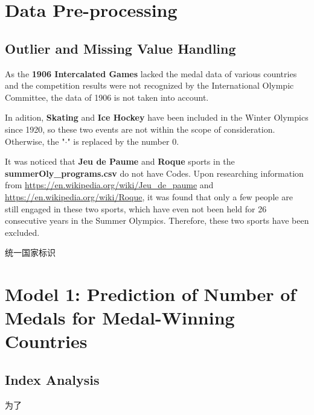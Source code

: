 \documentclass{mcmthesis}
\begin{document}
\section{Data Pre-processing}

\subsection{Outlier and Missing Value Handling}
As the \textbf{1906 Intercalated Games} lacked the medal data of various countries and the competition results were not recognized by the International Olympic Committee, the data of 1906 is not taken into account.

In adition, \textbf{Skating} and \textbf{Ice Hockey} have been included in the Winter Olympics since 1920, so these two events are not within the scope of consideration. Otherwise, the "$\cdot$" is replaced by the number $0$. 

It was noticed that \textbf{Jeu de Paume} and \textbf{Roque} sports in the {\bf summerOly\_programs.csv} do not have Codes. Upon researching information from {\color{blue}\url{https://en.wikipedia.org/wiki/Jeu_de_paume}} and {\color{blue}\url{https://en.wikipedia.org/wiki/Roque}}, it was found that only a few people are still engaged in these two sports, which have even not been held for 26 consecutive years in the Summer Olympics. Therefore, these two sports have been excluded.



统一国家标识













\section{Model 1: Prediction of Number of Medals for Medal-Winning Countries}

\subsection{Index Analysis}
为了
\end{document}
